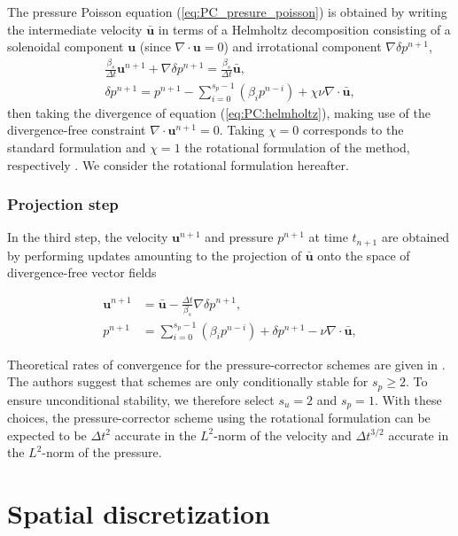 The pressure Poisson equation (\ref{eq:PC_presure_poisson}) is obtained by
writing the intermediate velocity $\bar{\bm{u}}$ in terms of a Helmholtz
decomposition consisting of a solenoidal component $\bm{u}$ (since $\nabla \cdot
\bm{u}= 0$) and irrotational component $\nabla \delta p^{n+1}$,
\begin{eqnarray}
  \frac{\beta_s}{\Delta t} \bm{u}^{n+1} + \nabla \delta p^{n+1} =
  \frac{\beta_s}{\Delta t} \bar{\bm{u}}, \label{eq:PC:helmholtz} \\
  \delta p^{n+1} = p^{n+1} 
    - \sum_{i=0}^{s_p-1}\left(\beta_i p^{n-i}\right) 
    + \chi \nu \nabla \cdot \bar{\bm{u}},
\end{eqnarray}
then taking the divergence of equation (\ref{eq:PC:helmholtz}), making use of the divergence-free constraint $\nabla \cdot \bm{u}^{n+1} = 0 $. Taking $\chi=0$ corresponds to the standard formulation and $\chi=1$ the rotational formulation of the method, respectively \cite{guermond_overview_2006}. We consider the rotational formulation hereafter.  

\subsubsection{Projection step}
In the third step, the velocity $\bm{u}^{n+1}$ and pressure $p^{n+1}$ at time $t_{n+1}$ are obtained by performing updates amounting to the projection of $\bar{\bm{u}}$ onto the space of divergence-free vector fields

\begin{align}
  \bm{u}^{n+1} &= \bar{\bm{u}} - \frac{\Delta t}{\beta_s} \nabla \delta p^{n+1}, \\
  p^{n+1} &= \sum_{i=0}^{s_p-1} \left(\beta_i p^{n-i}\right) 
  + \delta p^{n+1} 
  - \nu \nabla \cdot \bar{\bm{u}},
\end{align}

Theoretical rates of convergence for the pressure-corrector schemes are given in \cite{guermond_overview_2006}. The authors suggest that schemes are only conditionally stable for $s_p \geq 2$. To ensure unconditional stability, we therefore select $s_u = 2$ and $s_p = 1$. With these choices, the pressure-corrector scheme using the rotational formulation can be expected to be $\Delta t^2$ accurate in the $L^2$-norm of the velocity and $\Delta t^{3/2}$ accurate in the $L^2$-norm of the pressure.


\section{Spatial discretization}

